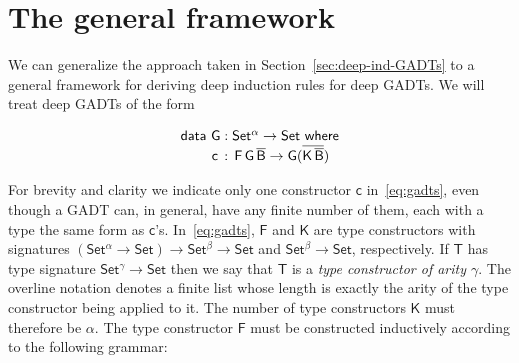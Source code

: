 \documentclass[9pt]{entcs}
\begin{document}
\section{The general framework}\label{sec:framework}

We can generalize the approach taken in
Section~\ref{sec:deep-ind-GADTs} to a general framework for deriving
deep induction rules for deep GADTs. We will treat deep GADTs of the
form 

\vspace*{-0.05in}

\begin{equation}\label{eq:gadts}
\begin{array}{l}
  \mathsf{data\ G : Set^\alpha
    \to Set\ where}\\
\mathsf{\;\;\;\;\;\;\;\;c\, :\, F\,G\,\overline{B} \to G (\overline{K\,\overline{B}})}
\end{array}
\end{equation}

\vspace*{-0.05in}

\noindent
For brevity and clarity we indicate only one constructor $\mathsf{c}$
in~\eqref{eq:gadts}, even though a GADT can, in general, have any
finite number of them, each with a type the same form as
$\mathsf{c}$'s. In~\eqref{eq:gadts}, $\mathsf{F}$ and $\mathsf{K}$ are
type constructors with signatures $\mathsf{(Set^{\alpha} \to Set) \to
  Set^{\beta} \to Set}$ and $\mathsf{Set^{\beta} \to Set}$,
respectively. If $\mathsf{T}$ has type signature $\mathsf{Set^{\gamma}
  \to Set}$ then we say that $\mathsf{T}$ is a {\em type constructor
  of arity $\mathsf{\gamma}$}.  The overline notation denotes a finite
list whose length is exactly the arity of the type constructor being
applied to it. The number of type constructors $\mathsf{K}$ must
therefore be $\alpha$. The type constructor $\mathsf{F}$ must be
constructed inductively according to the following grammar:

\vspace*{-0.05in}
\end{document}
